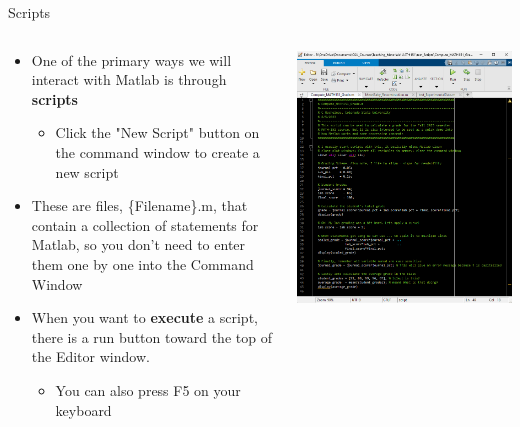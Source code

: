 {}\documentclass[letterpaper,
compress,
xcolor=x11names,
]{beamer}
\begin{document}
\begin{frame}{Scripts}
	\footnotesize
	\begin{columns}
		\begin{column}{0.5\linewidth}
			\begin{itemize}
				\item One of the primary ways we will interact with Matlab is through \textbf{scripts}
				\begin{itemize}
					\scriptsize
					\item Click the "New Script" button on the command window to create a new script
				\end{itemize}
				\item These are files, \{Filename\}.m, that contain a collection of statements for Matlab, so you don't need to enter them one by one into the Command Window
				\item When you want to \textbf{execute} a script, there is a run button toward the top of the Editor window.
				\begin{itemize}
					\scriptsize
					\item You can also press F5 on your keyboard
				\end{itemize}
			\end{itemize}
		\end{column}
		\begin{column}{0.5\linewidth}
			\includegraphics[width = \linewidth]{Script_example.png}
		\end{column}
	\end{columns}
\end{frame}
\end{document}
